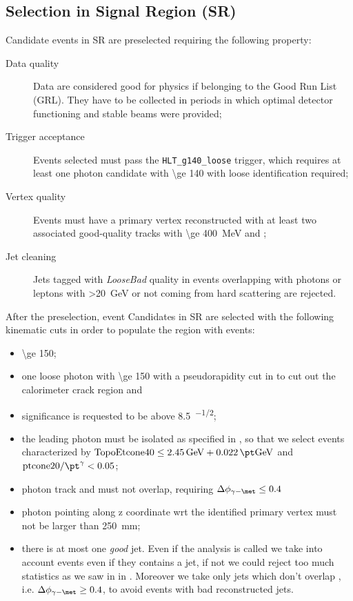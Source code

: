 \subsection{Selection in Signal Region (SR)}
Candidate events in SR are preselected requiring the following property:
\begin{description}
\item [Data quality] Data are considered good for physics if belonging to the Good Run List (GRL). They have to be collected in periods in which optimal detector functioning and stable beams were provided;
\item [Trigger acceptance] Events selected must pass the  \verb!HLT_g140_loose! trigger, which requires at least one photon candidate with \pt \SI{\ge 140}{\gev} with loose identification required;
\item [Vertex quality] Events must have a primary vertex reconstructed with at least two associated good-quality tracks with \pt \SI{\ge 400}{\MeV} and ;
\item [Jet cleaning] Jets tagged with {\itshape LooseBad} quality  in events overlapping with photons or leptons with \pt \SI{>20}{\GeV} or not coming from hard scattering are rejected.
\end{description}

After the preselection, event Candidates in SR are selected with the following kinematic cuts in order to populate the region with \gmet events:
\begin{itemize}
\item \met \SI{\ge 150}{\gev};
\item one loose photon with \pt \SI{\ge 150}{\gev} with a pseudorapidity cut in  to cut out the calorimeter crack region and 
\item \met significance is requested to be above \SI{8.5}{\gev^{-1/2}};
\item the leading photon must be isolated as specified in \Sect{\ref{sec:phisolation}}, so that we select events characterized by $ \text{TopoEtcone40} \le \SI{2.45}{\GeV} + \SI{0.022}{\pt\GeV}$ and $\text{ptcone20}/\pt^\gamma<0.05$;
\item photon track and \met must not overlap, requiring $\Delta\phi_{\gamma - \met} \le 0.4$
\item photon pointing along z coordinate wrt the identified primary vertex must not be larger than \SI{250}{\mm};
\item there is at most one {\itshape good} jet. Even if the analysis is called \mph we take into account events even if they contains a jet, if not we could reject too much statistics as we saw in \Sect{\ref{sec:truth}} in \Fig{\ref{fig:validation}}. Moreover we take only jets which don't overlap \met, i.e. $\Delta\phi_{\gamma -\met} \ge 0.4$, to avoid events with bad reconstructed jets.

\end{itemize}

